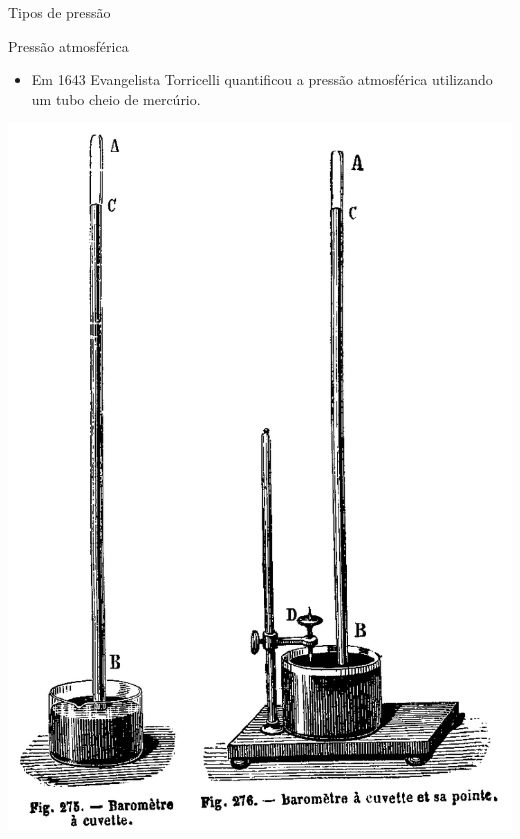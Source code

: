 \begin{frame}{Tipos de pressão}
	\begin{block}{Pressão atmosférica}
		\begin{itemize}
			\item Em 1643 Evangelista Torricelli quantificou a pressão atmosférica utilizando um tubo cheio de mercúrio.
		\end{itemize}
	\end{block}
	
	\vspace{0.5cm}
	
	\centering
	\includegraphics[height=0.6\textheight]{Figuras/Ch11/fig6n2}
\end{frame}


